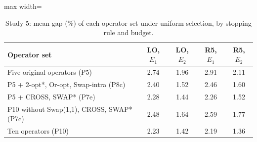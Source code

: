 \begin{table}[t]
\caption{Study 5: mean gap (\%) of each operator set under uniform selection, by stopping rule and budget.}\label{tab:s5}
\centering
\small
\begin{adjustbox}{max width=\linewidth}
\begin{tabular}{lcccc}
\toprule
Operator set & LO, $E_1$ & LO, $E_2$ & R5, $E_1$ & R5, $E_2$ \\
\midrule
Five original operators (P5) & 2.74 & 1.96 & 2.91 & 2.11 \\
P5 + 2-opt*, Or-opt, Swap-intra (P8c) & 2.40 & 1.52 & 2.46 & 1.60 \\
P5 + CROSS, SWAP* (P7e) & 2.28 & 1.44 & 2.26 & 1.52 \\
P10 without Swap(1,1), CROSS, SWAP* (P7c) & 2.48 & 1.64 & 2.59 & 1.77 \\
Ten operators (P10) & 2.23 & 1.42 & 2.19 & 1.36 \\
\bottomrule
\end{tabular}
\end{adjustbox}
\end{table}
